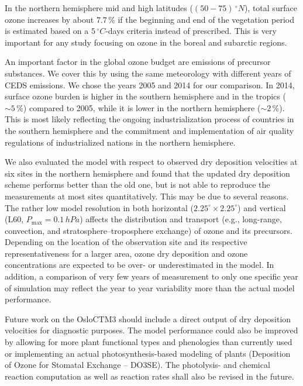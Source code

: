 \documentclass[gmd, manuscript]{copernicus}
\begin{document}
In the northern hemisphere mid and high latitudes ($(50-75)\,\unit{^\circ N}$), total surface ozone increases by about $7.7\,\unit{\%}$ if the beginning and end of the vegetation period is estimated based on a $5\,\unit{^\circ C}$-days criteria instead of prescribed. This is very important for any study focusing on ozone in the boreal and subarctic regions.

An important factor in the global ozone budget are emissions of precursor substances. We cover this by using the same meteorology with different years of CEDS emissions. We chose the years 2005 and 2014 for our comparison. In 2014, surface ozone burden is higher in the southern hemisphere and in the tropics ($\sim 5\,\unit{\%}$) compared to 2005, while it is lower in the northern hemisphere ($\sim 2\,\unit{\%}$). This is most likely reflecting the ongoing industrialization process of countries in the southern hemisphere and the commitment and implementation of air quality regulations of industrialized nations in the northern hemisphere.

We also evaluated the model with respect to observed dry deposition velocities at six sites in the northern hemisphere and found that the updated dry deposition scheme performs better than the old one, but is not able to reproduce the measurements at most sites quantitatively. This may be due to several reasons. The rather low model resolution in both horizontal ($2.25^\circ\times 2.25^\circ$) and vertical (L60, $P_\text{max}=0.1\,\unit{hPa}$) affects the distribution and transport (e.g., long-range, convection, and stratosphere--troposphere exchange) of ozone and its precursors. Depending on the location of the observation site and its respective representativeness for a larger area, ozone dry deposition and ozone concentrations are expected to be over- or underestimated in the model. In addition, a comparison of very few years of measurement to only one specific year of simulation may reflect the year to year variability more than the actual model performance.

Future work on the OsloCTM3 should include a direct output of dry deposition velocities for diagnostic purposes. The model performance could also be improved by allowing for more plant functional types and phenologies than currently used or implementing an actual photosynthesis-based modeling of plants (Deposition of Ozone for Stomatal Exchange -- DO3SE). The photolysis- and chemical reaction computation as well as reaction rates shall also be revised in the future.
\end{document}
